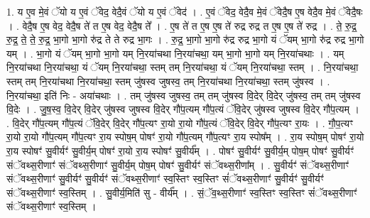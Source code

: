 \documentclass[17pt]{extarticle}
\begin{document}
1. य ए॒व मे॒वं ॅयो य ए॒वं ॅवेद॒ वेदै॒वं ॅयो य ए॒वं ॅवेद॑ । . ए॒वं ॅवेद॒ वेदै॒व मे॒वं ॅवेदै॒ष ए॒ष वेदै॒व मे॒वं ॅवेदै॒षः । . वेदै॒ष ए॒ष वेद॒ वेदै॒ष ते॑ त ए॒ष वेद॒ वेदै॒ष ते᳚ । . ए॒ष ते॑ त ए॒ष ए॒ष ते॑ रुद्र रुद्र त ए॒ष ए॒ष ते॑ रुद्र । . ते॒ रु॒द्र॒ रु॒द्र॒ ते॒ ते॒ रु॒द्र॒ भा॒गो भा॒गो रु॑द्र ते ते रुद्र भा॒गः । . रु॒द्र॒ भा॒गो भा॒गो रु॑द्र रुद्र भा॒गो यं ॅयम् भा॒गो रु॑द्र रुद्र भा॒गो यम् । . भा॒गो यं ॅयम् भा॒गो भा॒गो यम् नि॒रया॑चथा नि॒रया॑चथा॒ यम् भा॒गो भा॒गो यम् नि॒रया॑चथाः । . यम् नि॒रया॑चथा नि॒रया॑चथा॒ यं ॅयम् नि॒रया॑चथा॒ स्तम् तम् नि॒रया॑चथा॒ यं ॅयम् नि॒रया॑चथा॒ स्तम् । . नि॒रया॑चथा॒ स्तम् तम् नि॒रया॑चथा नि॒रया॑चथा॒ स्तम् जु॑षस्व जुषस्व॒ तम् नि॒रया॑चथा नि॒रया॑चथा॒ स्तम् जु॑षस्व । . नि॒रया॑चथा॒ इति॑ निः - अया॑चथाः । . तम् जु॑षस्व जुषस्व॒ तम् तम् जु॑षस्व वि॒देर् वि॒देर् जु॑षस्व॒ तम् तम् जु॑षस्व वि॒देः । . जु॒ष॒स्व॒ वि॒देर् वि॒देर् जु॑षस्व जुषस्व वि॒देर् गौ॑प॒त्यम् गौ॑प॒त्यं ॅवि॒देर् जु॑षस्व जुषस्व वि॒देर् गौ॑प॒त्यम् । . वि॒देर् गौ॑प॒त्यम् गौ॑प॒त्यं ॅवि॒देर् वि॒देर् गौ॑प॒त्यꣳ रा॒यो रा॒यो गौ॑प॒त्यं ॅवि॒देर् वि॒देर् गौ॑प॒त्यꣳ रा॒यः । . गौ॒प॒त्यꣳ रा॒यो रा॒यो गौ॑प॒त्यम् गौ॑प॒त्यꣳ रा॒य स्पोष॒म् पोषꣳ॑ रा॒यो गौ॑प॒त्यम् गौ॑प॒त्यꣳ रा॒य स्पोष᳚म् । . रा॒य स्पोष॒म् पोषꣳ॑ रा॒यो रा॒य स्पोषꣳ॑ सु॒वीर्यꣳ॑ सु॒वीर्य॒म् पोषꣳ॑ रा॒यो रा॒य स्पोषꣳ॑ सु॒वीर्य᳚म् । . पोषꣳ॑ सु॒वीर्यꣳ॑ सु॒वीर्य॒म् पोष॒म् पोषꣳ॑ सु॒वीर्यꣳ॑ संॅवथ्स॒रीणाꣳ॑ संॅवथ्स॒रीणाꣳ॑ सु॒वीर्य॒म् पोष॒म् पोषꣳ॑ सु॒वीर्यꣳ॑ संॅवथ्स॒रीणा᳚म् । . सु॒वीर्यꣳ॑ संॅवथ्स॒रीणाꣳ॑ संॅवथ्स॒रीणाꣳ॑ सु॒वीर्यꣳ॑ सु॒वीर्यꣳ॑ संॅवथ्स॒रीणाꣳ॑ स्व॒स्तिꣳ स्व॒स्तिꣳ सं॑ॅवथ्स॒रीणाꣳ॑ सु॒वीर्यꣳ॑ सु॒वीर्यꣳ॑ संॅवथ्स॒रीणाꣳ॑ स्व॒स्तिम् । . सु॒वीर्य॒मिति॑ सु - वीर्य᳚म् । . सं॒ॅव॒थ्स॒रीणाꣳ॑ स्व॒स्तिꣳ स्व॒स्तिꣳ सं॑ॅवथ्स॒रीणाꣳ॑ संॅवथ्स॒रीणाꣳ॑ स्व॒स्तिम् । \newline
\end{document}

